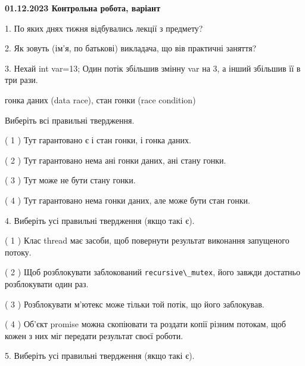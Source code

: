 \documentclass[12pt, ukrainian]{article}
\def\code#1{\Verb!#1!}
\begin{document}
\vspace{4mm}
\newpage
\begin {large}

\textbf{01.12.2023 Контрольна робота, варіант  }\par


{
1. По яких днях тижня відбувались лекції з предмету?



\vspace{5mm}
2. Як зовуть (ім'я, по батькові) викладача, що вів практичні заняття?



\vspace{5mm}
3. Нехай int var=13; Один потік збільшив змінну var на 3, а інший збільшив її в три рази.

гонка даних (data race), стан гонки (race condition)

Виберіть всі правильні твердження.\par
\vspace{2mm}
( 1 ) Тут гарантовано є і стан гонки, і гонка даних.%

( 2 ) Тут гарантовано нема ані гонки даних, ані стану гонки.%

( 3 ) Тут може не бути стану гонки.%

( 4 ) Тут гарантовано нема гонки даних, але може бути стан гонки.%


\vspace{5mm}
4. Виберіть усі правильні твердження (якщо такі є).\par
\vspace{2mm}

( 1 ) Клас thread має засоби, щоб повернути результат виконання запущеного потоку.%

( 2 ) Щоб розблокувати заблокований \code{recursive\_mutex}, його завжди достатньо розблокувати один раз.%

( 3 ) Розблокувати м’ютекс може тільки той потік, що його заблокував.%

( 4 ) Об’єкт promise можна скопіювати та роздати копії різним потокам, щоб кожен з них міг передати результат своєї роботи.%


\vspace{5mm}
5. Виберіть усі правильні твердження (якщо такі є).\par
\vspace{2mm}

}
\end{large}
\end{document}
